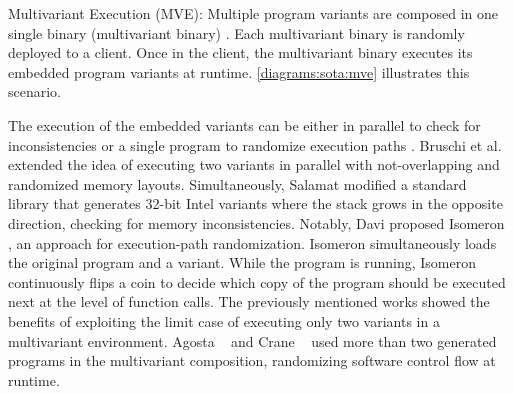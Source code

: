 \begin{usage}{Multivariant Execution (MVE):}
    \label{usage:mve}
    \normalfont
    Multiple program variants are composed in one single binary (multivariant binary) \cite{cox06}. Each multivariant binary is randomly deployed to a client. Once in the client, the multivariant binary executes its embedded program variants at runtime. \autoref{diagrams:sota:mve} illustrates this scenario. 
    
\end{usage}

The execution of the embedded variants can be either in parallel to check for inconsistencies or a single program to randomize execution paths \cite{bhatkar03}. 
Bruschi et al. \cite{bruschi2007diversified} extended the idea of executing two variants in parallel with not-overlapping and randomized memory layouts. Simultaneously, Salamat \etal \cite{salamat2007stopping} modified a standard library that generates 32-bit Intel variants where the stack grows in the opposite direction, checking for memory inconsistencies. 
Notably, Davi \etal proposed Isomeron \cite{davi2015isomeron}, an approach for execution-path randomization. Isomeron simultaneously loads the original program and a variant. While the program is running, Isomeron continuously flips a coin to decide which copy of the program should be executed next at the level of function calls. 
The previously mentioned works showed the benefits of exploiting the limit case of executing only two variants in a multivariant environment.
Agosta \etal~\cite{agosta2015meet} and Crane \etal~\cite{crane2015thwarting} used more than two generated programs in the multivariant composition, randomizing software control flow at runtime. 






